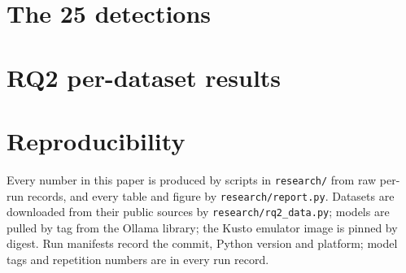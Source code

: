 \section{The 25 detections}
\label{app:rules}
\begin{table}[h]\centering\small
\resizebox{\textwidth}{!}{}
\caption{The detection pack. OWASP LLM01 to LLM10 refer to the LLM Top~10 2025, ASI01 to ASI09 to the
Agentic Top~10 2026; ATLAS technique IDs are from release 2026.09 (prefix AML. omitted).}
\label{tab:rules}
\end{table}

\section{RQ2 per-dataset results}
\begin{table}[h]\centering\small
\resizebox{\textwidth}{!}{}
\caption{Content signatures (any of the rules relevant to the surface) per public dataset.}
\label{tab:rq2-datasets}
\end{table}

\section{Reproducibility}
Every number in this paper is produced by scripts in \texttt{research/} from raw per-run records, and
every table and figure by \texttt{research/report.py}. Datasets are downloaded from their public
sources by \texttt{research/rq2\_data.py}; models are pulled by tag from the Ollama library; the Kusto
emulator image is pinned by digest. Run manifests record the commit, Python version and platform; model tags and
repetition numbers are in every run record.

